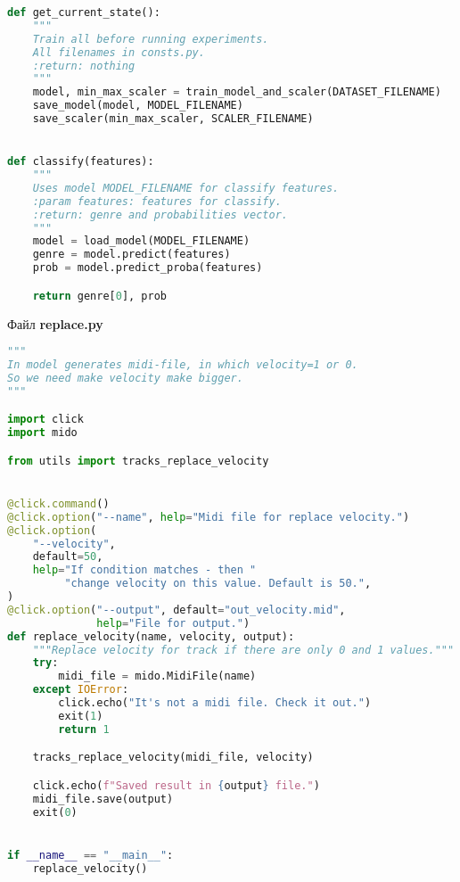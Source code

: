 \begin{lstlisting}[language=Python]
def get_current_state():
    """
    Train all before running experiments.
    All filenames in consts.py.
    :return: nothing
    """
    model, min_max_scaler = train_model_and_scaler(DATASET_FILENAME)
    save_model(model, MODEL_FILENAME)
    save_scaler(min_max_scaler, SCALER_FILENAME)


def classify(features):
    """
    Uses model MODEL_FILENAME for classify features.
    :param features: features for classify.
    :return: genre and probabilities vector.
    """
    model = load_model(MODEL_FILENAME)
    genre = model.predict(features)
    prob = model.predict_proba(features)

    return genre[0], prob

\end{lstlisting}

Файл \textbf{replace.py}

\begin{lstlisting}[language=Python]
"""
In model generates midi-file, in which velocity=1 or 0.
So we need make velocity make bigger.
"""

import click
import mido

from utils import tracks_replace_velocity


@click.command()
@click.option("--name", help="Midi file for replace velocity.")
@click.option(
    "--velocity",
    default=50,
    help="If condition matches - then " 
         "change velocity on this value. Default is 50.",
)
@click.option("--output", default="out_velocity.mid",
              help="File for output.")
def replace_velocity(name, velocity, output):
    """Replace velocity for track if there are only 0 and 1 values."""
    try:
        midi_file = mido.MidiFile(name)
    except IOError:
        click.echo("It's not a midi file. Check it out.")
        exit(1)
        return 1

    tracks_replace_velocity(midi_file, velocity)

    click.echo(f"Saved result in {output} file.")
    midi_file.save(output)
    exit(0)


if __name__ == "__main__":
    replace_velocity()

\end{lstlisting}

